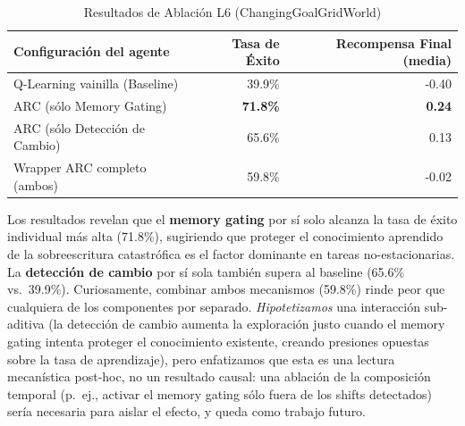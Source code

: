 \documentclass{article}
\begin{document}
\begin{table}[htbp]
\centering
\footnotesize
\caption{Resultados de Ablación L6 (ChangingGoalGridWorld)}
\label{tab:l6_ablation}
\begin{tabular}{lrr}
    \toprule
    Configuración del agente & Tasa de Éxito & Recompensa Final (media) \\
    \midrule
    Q-Learning vainilla (Baseline) & 39.9\% & -0.40 \\
    ARC (sólo Memory Gating) & \textbf{71.8\%} & \textbf{0.24} \\
    ARC (sólo Detección de Cambio) & 65.6\% & 0.13 \\
    Wrapper ARC completo (ambos) & 59.8\% & -0.02 \\
    \bottomrule
\end{tabular}
\end{table}

Los resultados revelan que el \textbf{memory gating} por sí solo alcanza la tasa de éxito individual más alta (71.8\%), sugiriendo que proteger el conocimiento aprendido de la sobreescritura catastrófica es el factor dominante en tareas no-estacionarias. La \textbf{detección de cambio} por sí sola también supera al baseline (65.6\% vs.\ 39.9\%). Curiosamente, combinar ambos mecanismos (59.8\%) rinde peor que cualquiera de los componentes por separado. \emph{Hipotetizamos} una interacción sub-aditiva (la detección de cambio aumenta la exploración justo cuando el memory gating intenta proteger el conocimiento existente, creando presiones opuestas sobre la tasa de aprendizaje), pero enfatizamos que esta es una lectura mecanística post-hoc, no un resultado causal: una ablación de la composición temporal (p.\ ej., activar el memory gating sólo fuera de los shifts detectados) sería necesaria para aislar el efecto, y queda como trabajo futuro.
\end{document}
